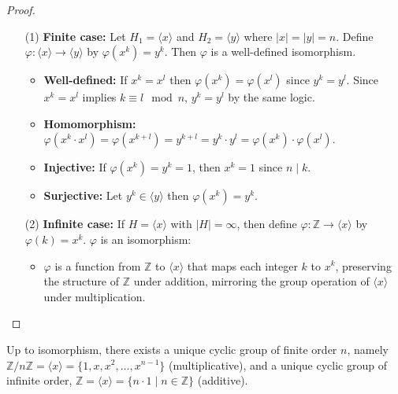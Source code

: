 \documentclass[11pt,a4paper]{article}
\begin{document}
\begin{proof}
    
\begin{enumerate}
    \item[(1)] \textbf{Finite case:}
    Let \( H_1 = \langle x \rangle \) and \( H_2 = \langle y \rangle \) where \( |x| = |y| = n \).
    Define \( \varphi: \langle x \rangle \to \langle y \rangle \) by \( \varphi(x^k) = y^k \).
    Then \( \varphi \) is a well-defined isomorphism.
    
    \begin{itemize}
        \item \textbf{Well-defined:} If \( x^k = x^l \) then \( \varphi(x^k) = \varphi(x^l) \) since \( y^k = y^l \).
        Since \( x^k = x^l \) implies \( k \equiv l \mod n \), \( y^k = y^l \) by the same logic.
        \item \textbf{Homomorphism:} \( \varphi(x^k \cdot x^l) = \varphi(x^{k+l}) = y^{k+l} = y^k \cdot y^l = \varphi(x^k) \cdot \varphi(x^l) \).
        \item \textbf{Injective:} If \( \varphi(x^k) = y^k = 1 \), then \( x^k = 1 \) since \( n \mid k \).
        \item \textbf{Surjective:} Let \( y^k \in \langle y \rangle \) then \( \varphi(x^k) = y^k \).
    \end{itemize}
    
    \item[(2)] \textbf{Infinite case:}
    If \( H = \langle x \rangle \) with \( |H| = \infty \), then define \( \varphi: \mathbb{Z} \to \langle x \rangle \) by \( \varphi(k) = x^k \).
    \( \varphi \) is an isomorphism:
    \begin{itemize}
        \item \( \varphi \) is a function from \( \mathbb{Z} \) to \( \langle x \rangle \) that maps each integer \( k \) to \( x^k \), preserving the structure of \( \mathbb{Z} \) under addition, mirroring the group operation of \( \langle x \rangle \) under multiplication.
    \end{itemize}
\end{enumerate}
\end{proof}

\begin{rem}
    Up to isomorphism, there exists a unique cyclic group of finite order \( n \), namely \( \mathbb{Z}/n\mathbb{Z} = \langle x \rangle = \{1, x, x^2, \ldots, x^{n-1}\} \) (multiplicative), and a unique cyclic group of infinite order, \( \mathbb{Z} = \langle x \rangle = \{n \cdot 1 \mid n \in \mathbb{Z}\} \) (additive).
\end{rem}
\end{document}
